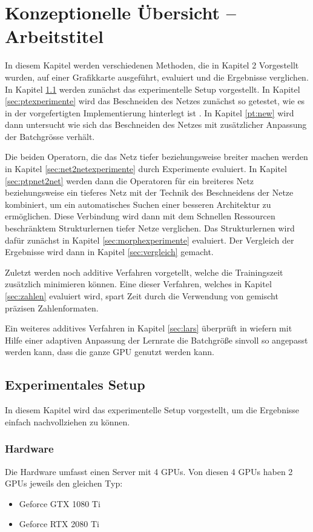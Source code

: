\chapter{Konzeptionelle Übersicht -- Arbeitstitel}\label{sec:experimente}
In diesem Kapitel werden verschiedenen Methoden, die in Kapitel 2 Vorgestellt wurden, auf einer Grafikkarte ausgeführt, evaluiert und die Ergebnisse verglichen. In Kapitel \ref{sec:setup} werden zunächst das experimentelle Setup vorgestellt. In Kapitel \ref{sec:ptexperimente} wird das Beschneiden des Netzes zunächst so getestet, wie es in der vorgefertigten Implementierung hinterlegt ist \cite{ptImpl}. In Kapitel \ref{pt:new} wird dann untersucht wie sich das Beschneiden des Netzes mit zusätzlicher Anpassung der Batchgrösse verhält.

Die beiden Operatorn, die das Netz tiefer beziehungsweise breiter machen werden in Kapitel \ref{sec:net2netexperimente} durch Experimente evaluiert. In Kapitel \ref{sec:ptpnet2net} werden dann die Operatoren für ein breiteres Netz beziehungsweise ein tieferes Netz mit der Technik des Beschneidens der Netze kombiniert, um ein automatisches Suchen einer besseren Architektur zu ermöglichen. Diese Verbindung wird dann mit dem Schnellen Ressourcen beschränktem Strukturlernen tiefer Netze verglichen. Das Strukturlernen wird dafür zunächst in Kapitel \ref{sec:morphexperimente} evaluiert. Der Vergleich der Ergebnisse wird dann in Kapitel \ref{sec:vergleich} gemacht.


Zuletzt werden noch additive Verfahren vorgetellt, welche die Trainingszeit zusätzlich minimieren können.
Eine dieser Verfahren, welches in Kapitel \ref{sec:zahlen} evaluiert wird, spart Zeit durch die Verwendung von gemischt präzisen Zahlenformaten.

Ein weiteres additives Verfahren in Kapitel \ref{sec:lars} überprüft in wiefern mit Hilfe einer adaptiven Anpassung der Lernrate die Batchgröße sinvoll so angepasst werden kann, dass die ganze GPU genutzt werden kann.
\section{Experimentales Setup}\label{sec:setup}
In diesem Kapitel wird das experimentelle Setup vorgestellt, um die Ergebnisse einfach nachvollziehen zu können.
\subsection{Hardware}
Die Hardware umfasst einen Server mit 4 GPUs.
Von diesen 4 GPUs haben 2 GPUs jeweils den gleichen Typ:
\begin{itemize}
 \item Geforce GTX 1080 Ti
 \item Geforce RTX 2080 Ti 
\end{itemize}

